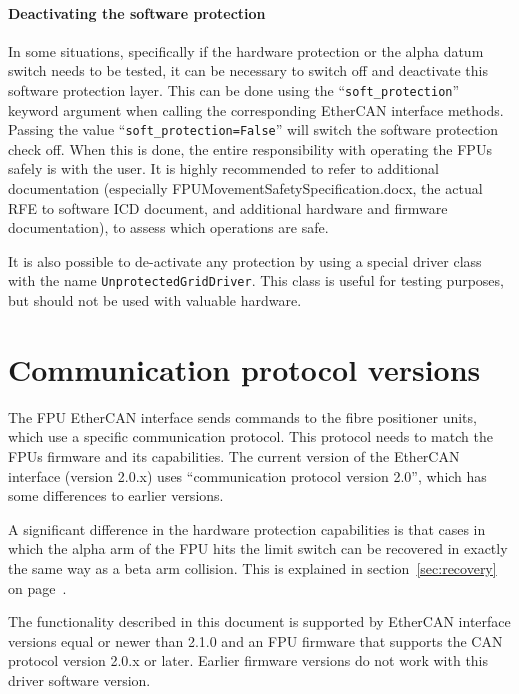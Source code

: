 \documentclass[fontsize=12,a4paper]{scrreprt}
\begin{document}
\paragraph{Deactivating the software protection}
In some situations, specifically if the hardware protection or the
alpha datum switch needs to be tested, it can be necessary to switch
off and deactivate this software protection layer. This can be done
using the ``\texttt{soft\_protection}'' keyword argument when calling
the corresponding EtherCAN interface methods. Passing the value
``\texttt{soft\_protection=False}'' will switch the software
protection check off. When this is done, the entire responsibility
with operating the FPUs safely is with the user. It is highly
recommended to refer to additional documentation (especially
FPUMovementSafetySpecification.docx, the actual RFE to software ICD
document, and additional hardware and firmware documentation), to
assess which operations are safe.

It is also possible to de-activate any protection by using a special
driver class with the name \texttt{UnprotectedGridDriver}. This class
is useful for testing purposes, but should not be used with valuable
hardware.



\section{Communication protocol versions}
 
 The FPU EtherCAN interface
sends commands to the fibre positioner units, which use a specific
communication protocol. This protocol needs to match the FPUs firmware
and its capabilities. The current version of the EtherCAN interface (version
2.0.x) uses ``communication protocol version 2.0'', which has some
differences to earlier versions.

A significant difference in the hardware protection capabilities is
that cases in which the alpha arm of the FPU hits the limit switch can
be recovered in exactly the same way as a beta arm collision. This is
explained in section~\ref{sec:recovery} on
page~\pageref{sec:recovery}.


The functionality described in this document is supported by EtherCAN
interface versions equal or newer than 2.1.0 and an FPU firmware that
supports the CAN protocol version 2.0.x or later. Earlier firmware
versions do not work with this driver software version.
\end{document}
